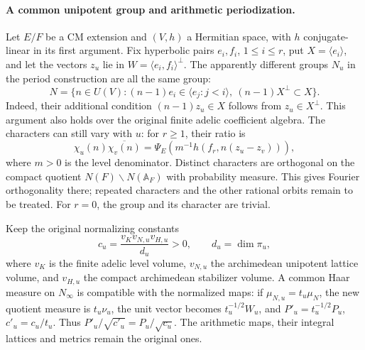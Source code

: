 \paragraph{A common unipotent group and arithmetic periodization.}
Let \(E/F\) be a CM extension and \((V,h)\) a Hermitian space,
with \(h\) conjugate-linear in its first argument. Fix hyperbolic pairs
\(e_i,f_i\), \(1\le i\le r\), put \(X=\langle e_i\rangle\),
and let the vectors \(z_u\) lie in
\(W=\langle e_i,f_i\rangle^\perp\). The apparently different groups
\(N_u\) in the period construction are all the same group:
\[
 N=\{n\in U(V): (n-1)e_i\in\langle e_j:j<i\rangle,
                  \ (n-1)X^\perp\subset X\}.
\]
Indeed, their additional condition \((n-1)z_u\in X\) follows from
\(z_u\in X^\perp\). This argument also holds over the original finite
adelic coefficient algebra. The characters can still vary with \(u\):
for \(r\ge1\), their ratio is
\[
 \chi_u(n)\overline{\chi_v(n)}
 =\Psi_E\!\left(m^{-1}h(f_r,n(z_u-z_v))\right),
\]
where \(m>0\) is the level denominator. Distinct characters are
orthogonal on the compact quotient \(N(F)\backslash N(\mathbb A_F)\)
with probability measure. This gives Fourier orthogonality there;
repeated characters and the other rational orbits remain to be treated.
For \(r=0\), the group and its character are trivial.

Keep the original normalizing constants
\[
 c_u=\frac{v_Kv_{N,u}v_{H,u}}{d_u}>0,\qquad d_u=\dim\pi_u,
\]
where \(v_K\) is the finite adelic level volume, \(v_{N,u}\) the
archimedean unipotent lattice volume, and \(v_{H,u}\) the compact
archimedean stabilizer volume. A common Haar measure on \(N_\infty\)
is compatible with the normalized maps: if
\(\mu_{N,u}=t_u\mu_N\), the new quotient measure is \(t_u\nu_u\),
the unit vector becomes \(t_u^{-1/2}W_u\), and
\(P'_u=t_u^{-1/2}P_u\), \(c'_u=c_u/t_u\). Thus
\(P'_u/\sqrt{c'_u}=P_u/\sqrt{c_u}\). The arithmetic maps, their
integral lattices and metrics remain the original ones.

